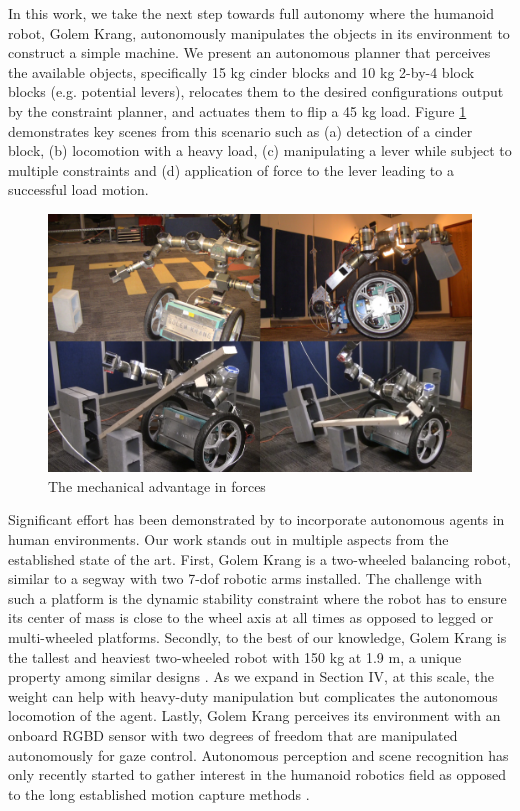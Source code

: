 \documentclass[runningheads,a4paper]{llncs}
\begin{document}
In this work, we take the next step towards full autonomy where the humanoid robot, Golem Krang,
autonomously manipulates the objects in its environment to construct a simple machine. We present
an autonomous planner that perceives the available objects, specifically 15 kg cinder blocks and 10
kg 2-by-4 block blocks (e.g. potential levers), relocates them to the desired configurations output
by the constraint planner, and actuates them to flip a 45 kg load. Figure \ref{fig:showOff} demonstrates key scenes
from this scenario such as (a) detection of a cinder block, (b) locomotion with a heavy load, (c)
manipulating a lever while subject to multiple constraints and (d) application of force to the lever
leading to a successful load motion.

\begin{figure}[ht!] 
  \centering
  \includegraphics[width=1.0\linewidth]{Figures/showOff.png}
  \caption{The mechanical advantage in forces}
  \label{fig:showOff}
\end{figure}

Significant effort has been demonstrated by \cite{beetz2010cram} \cite{stilman2005navigation}
\cite{kemp2007challenges} to incorporate autonomous agents in human environments. Our work stands
out in multiple aspects from the established state of the art. First, Golem Krang is a two-wheeled
balancing robot, similar to a segway with two 7-dof robotic arms installed. The challenge with
such a platform is the dynamic stability constraint where the robot has to ensure its center of mass
is close to the wheel axis at all times as opposed to legged or multi-wheeled platforms. Secondly, to the best of our knowledge,
Golem Krang is the tallest and heaviest two-wheeled robot with 150 kg at 1.9 m, a unique property
among similar designs \cite{kuindersma2009dexterous}. As we expand in Section IV, at this scale, the
weight can help with heavy-duty manipulation but complicates the autonomous locomotion of the
agent. Lastly, Golem Krang perceives its environment with an onboard RGBD sensor with two degrees
of freedom that are manipulated autonomously for gaze control. Autonomous perception and scene
recognition has only recently started to gather interest in the humanoid robotics field
\cite{srinivasa2010herb} \cite{nishiwaki2000design} as opposed to the long established motion
capture methods \cite{dasgupta1999making}.
\end{document}
